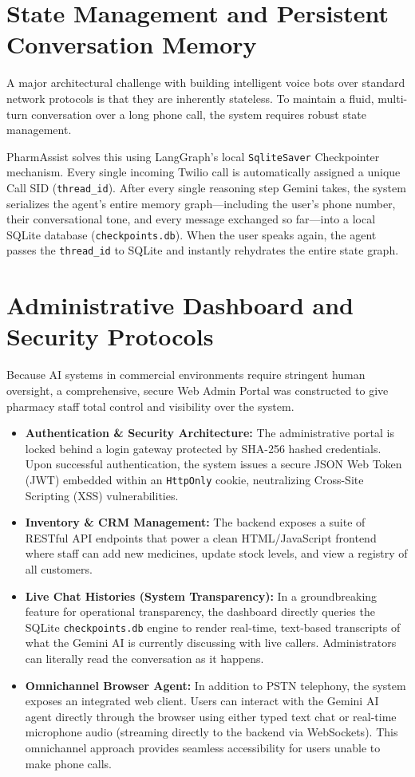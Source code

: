 \documentclass[conference]{IEEEtran}
\begin{document}
\section{State Management and Persistent Conversation Memory}
A major architectural challenge with building intelligent voice bots over standard network protocols is that they are inherently stateless. To maintain a fluid, multi-turn conversation over a long phone call, the system requires robust state management.

PharmAssist solves this using LangGraph's local \texttt{SqliteSaver} Checkpointer mechanism. Every single incoming Twilio call is automatically assigned a unique Call SID (\texttt{thread\_id}). After every single reasoning step Gemini takes, the system serializes the agent's entire memory graph---including the user's phone number, their conversational tone, and every message exchanged so far---into a local SQLite database (\texttt{checkpoints.db}). When the user speaks again, the agent passes the \texttt{thread\_id} to SQLite and instantly rehydrates the entire state graph.

\section{Administrative Dashboard and Security Protocols}
Because AI systems in commercial environments require stringent human oversight, a comprehensive, secure Web Admin Portal was constructed to give pharmacy staff total control and visibility over the system.

\begin{itemize}
    \item \textbf{Authentication \& Security Architecture:} The administrative portal is locked behind a login gateway protected by SHA-256 hashed credentials. Upon successful authentication, the system issues a secure JSON Web Token (JWT) embedded within an \texttt{HttpOnly} cookie, neutralizing Cross-Site Scripting (XSS) vulnerabilities.
    \item \textbf{Inventory \& CRM Management:} The backend exposes a suite of RESTful API endpoints that power a clean HTML/JavaScript frontend where staff can add new medicines, update stock levels, and view a registry of all customers.
    \item \textbf{Live Chat Histories (System Transparency):} In a groundbreaking feature for operational transparency, the dashboard directly queries the SQLite \texttt{checkpoints.db} engine to render real-time, text-based transcripts of what the Gemini AI is currently discussing with live callers. Administrators can literally read the conversation as it happens.
    \item \textbf{Omnichannel Browser Agent:} In addition to PSTN telephony, the system exposes an integrated web client. Users can interact with the Gemini AI agent directly through the browser using either typed text chat or real-time microphone audio (streaming directly to the backend via WebSockets). This omnichannel approach provides seamless accessibility for users unable to make phone calls.
\end{itemize}
\end{document}
